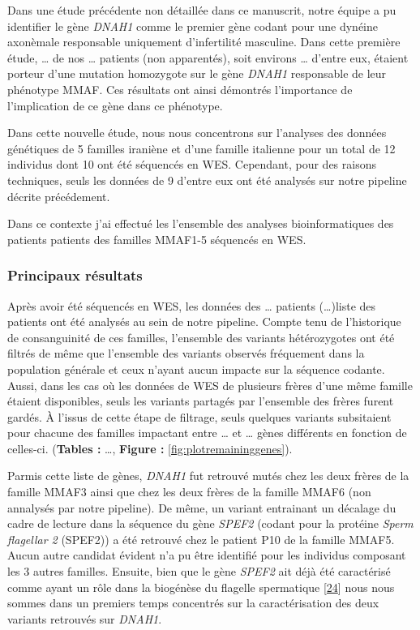 \documentclass[12pt,twoside]{reedthesis}
\theoremstyle{definition}
\theoremstyle{definition}
\theoremstyle{remark}
\begin{document}
  Dans une étude précédente non détaillée dans ce manuscrit, notre équipe
  a pu identifier le gène \emph{DNAH1} comme le premier gène codant pour
  une dynéine axonèmale responsable uniquement d'infertilité masculine.
  Dans cette première étude, \ldots{} de nos \ldots{} patients (non
  apparentés), soit environs \ldots{} d'entre eux, étaient porteur d'une
  mutation homozygote sur le gène \emph{DNAH1} responsable de leur
  phénotype MMAF. Ces résultats ont ainsi démontrés l'importance de
  l'implication de ce gène dans ce phénotype.
  
  Dans cette nouvelle étude, nous nous concentrons sur l'analyses des
  données génétiques de 5 familles iraniène et d'une famille italienne
  pour un total de 12 individus dont 10 ont été séquencés en WES.
  Cependant, pour des raisons techniques, seuls les données de 9 d'entre
  eux ont été analysés sur notre pipeline décrite précédement.
  
  Dans ce contexte j'ai effectué les l'ensemble des analyses
  bioinformatiques des patients patients des familles MMAF1-5 séquencés en
  WES.
  
  \newpage
  
  
  
  \newpage
  
  \subsubsection{Principaux résultats}\label{principaux-resultats-2}
  
  Après avoir été séquencés en WES, les données des \ldots{} patients
  (\ldots{})liste des patients ont été analysés au sein de notre pipeline.
  Compte tenu de l'historique de consanguinité de ces familles, l'ensemble
  des variants hétérozygotes ont été filtrés de même que l'ensemble des
  variants observés fréquement dans la population générale et ceux n'ayant
  aucun impacte sur la séquence codante. Aussi, dans les cas où les
  données de WES de plusieurs frères d'une même famille étaient
  disponibles, seuls les variants partagés par l'ensemble des frères
  furent gardés. À l'issus de cette étape de filtrage, seuls quelques
  variants subsitaient pour chacune des familles impactant entre \ldots{}
  et \ldots{} gènes différents en fonction de celles-ci. (\textbf{Tables
  :} \ldots{}, \textbf{Figure : }\ref{fig:plotremaininggenes}).
  
  Parmis cette liste de gènes, \emph{DNAH1} fut retrouvé mutés chez les
  deux frères de la famille MMAF3 ainsi que chez les deux frères de la
  famille MMAF6 (non annalysés par notre pipeline). De même, un variant
  entrainant un décalage du cadre de lecture dans la séquence du gène
  \emph{SPEF2} (codant pour la protéine \emph{Sperm flagellar 2} (SPEF2))
  a été retrouvé chez le patient P10 de la famille MMAF5. Aucun autre
  candidat évident n'a pu être identifié pour les individus composant les
  3 autres familles. Ensuite, bien que le gène \emph{SPEF2} ait déjà été
  caractérisé comme ayant un rôle dans la biogénèse du flagelle
  spermatique {[}\protect\hyperlink{ref-Lehti2017}{24}{]} nous nous sommes
  dans un premiers temps concentrés sur la caractérisation des deux
  variants retrouvés sur \emph{DNAH1}.
  
\end{document}
